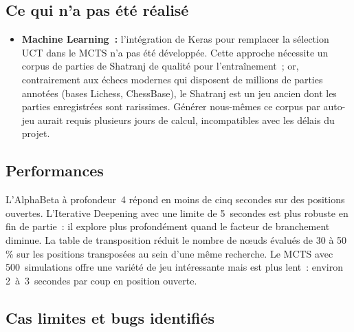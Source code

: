 \documentclass[a4paper,11pt]{article}
\begin{document}
\subsection{Ce qui n'a pas été réalisé}

\begin{itemize}[noitemsep]
  
  \item \textbf{Machine Learning~:} l'intégration de Keras pour remplacer
    la sélection UCT dans le MCTS n'a pas été développée. Cette approche
    nécessite un corpus de parties de Shatranj de qualité pour l'entraînement~;
    or, contrairement aux échecs modernes qui disposent de millions de parties
    annotées (bases Lichess, ChessBase), le Shatranj est un jeu ancien dont
    les parties enregistrées sont rarissimes. Générer nous-mêmes ce corpus
    par auto-jeu aurait requis plusieurs jours de calcul, incompatibles avec
    les délais du projet.
\end{itemize}

\subsection{Performances}

L'AlphaBeta à profondeur~4 répond en moins de cinq secondes sur des positions
ouvertes. L'Iterative Deepening avec une limite de 5~secondes est plus robuste
en fin de partie~: il explore plus profondément quand le facteur de branchement
diminue. La table de transposition réduit le nombre de nœuds évalués de 30 à 50\,\%
sur les positions transposées au sein d'une même recherche. Le MCTS avec 500~simulations offre
une variété de jeu intéressante mais est plus lent~: environ 2~à~3~secondes par
coup en position ouverte.

\subsection{Cas limites et bugs identifiés}
\end{document}
